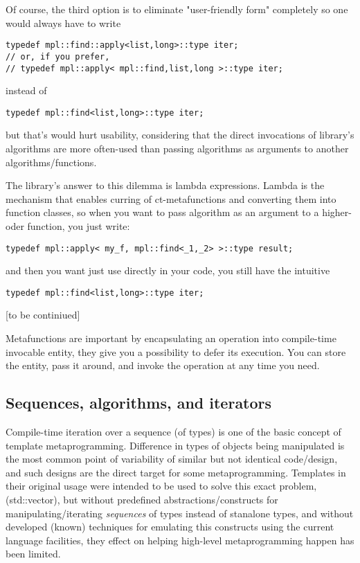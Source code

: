 \documentclass{netobjectdays}
\begin{document}
Of course, the third option is to eliminate 
"user-friendly form" completely so one would always 
have to write

{\footnotesize
\begin{verbatim}
typedef mpl::find::apply<list,long>::type iter;
// or, if you prefer,
// typedef mpl::apply< mpl::find,list,long >::type iter;
\end{verbatim}
}

instead of 

{\footnotesize
\begin{verbatim}
typedef mpl::find<list,long>::type iter;
\end{verbatim}
}

but that's would hurt usability, considering that the direct 
invocations of library's algorithms are more often-used than 
passing algorithms as arguments to another 
algorithms/functions. 

The library's answer to this dilemma is lambda expressions. 
Lambda is the mechanism that enables curring of 
ct-metafunctions and converting them into function classes, 
so when you want to pass  algorithm as an argument 
to a higher-oder function, you just write:

{\footnotesize
\begin{verbatim}
typedef mpl::apply< my_f, mpl::find<_1,_2> >::type result;
\end{verbatim}
}

and then you want just use  directly in your code, 
you still have the intuitive

{\footnotesize
\begin{verbatim}
typedef mpl::find<list,long>::type iter;
\end{verbatim}
}


[to be continiued]


Metafunctions are important by encapsulating an operation into 
compile-time invocable entity, they give you a possibility to 
defer its execution. You can store the entity, pass it around, 
and invoke the operation at any time you need.

\subsection{Sequences, algorithms, and iterators}

Compile-time iteration over a sequence (of types) is one of 
the basic concept of template metaprogramming. Difference in 
types of objects being manipulated is the most common point 
of variability of similar but not identical code/design, and 
such designs are the direct target for some metaprogramming. 
Templates in their original usage were intended to be used to 
solve this exact problem, (std::vector), but without predefined 
abstractions/constructs for manipulating/iterating 
\emph{sequences} of types instead of stanalone types, and 
without developed (known) techniques for emulating this 
constructs using the current language facilities, they effect 
on helping high-level metaprogramming happen has been limited. 
\end{document}
